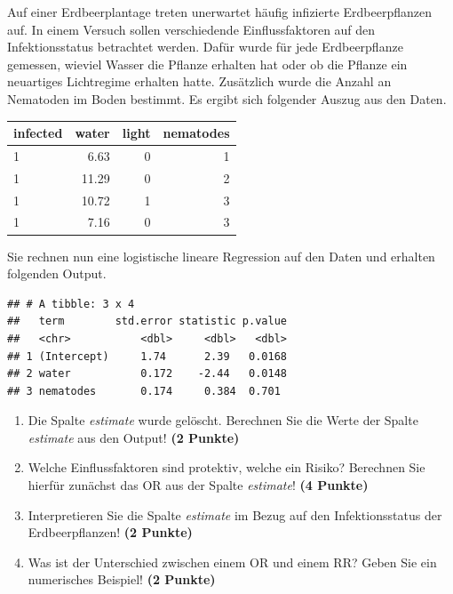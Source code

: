 \documentclass[a4paper, 10pt]{scrartcl}\usepackage[]{graphicx}\usepackage[]{xcolor}
\makeatletter
\newenvironment{kframe}{%
 \def\at@end@of@kframe{}%
 \ifinner\ifhmode%
  \def\at@end@of@kframe{\end{minipage}}%
  \begin{minipage}{\columnwidth}%
 \fi\fi%
 \def\FrameCommand##1{\hskip\@totalleftmargin \hskip-\fboxsep
 \colorbox{shadecolor}{##1}\hskip-\fboxsep
     \hskip-\linewidth \hskip-\@totalleftmargin \hskip\columnwidth}%
 \MakeFramed {\advance\hsize-\width
   \@totalleftmargin\z@ \linewidth\hsize
   \@setminipage}}%
 {\par\unskip\endMakeFramed%
 \at@end@of@kframe}
\newenvironment{knitrout}{}{} %
\makeatother
\begin{document}
Auf einer Erdbeerplantage treten unerwartet h{\"a}ufig infizierte
Erdbeerpflanzen auf. In einem Versuch sollen verschiedende Einflussfaktoren
auf den Infektionsstatus betrachtet werden. Daf{\"u}r wurde f{\"u}r jede
Erdbeerpflanze gemessen, wieviel Wasser die Pflanze erhalten hat oder ob
die Pflanze ein neuartiges Lichtregime erhalten hatte. Zus{\"a}tzlich wurde die
Anzahl an Nematoden im Boden bestimmt. Es ergibt sich folgender Auszug aus
den Daten.

\begin{knitrout}
\color{fgcolor}\begin{table}[!h]
\centering
\begin{tabular}{lrrr}
\toprule
infected & water & light & nematodes\\
\midrule
1 & 6.63 & 0 & 1\\
1 & 11.29 & 0 & 2\\
1 & 10.72 & 1 & 3\\
1 & 7.16 & 0 & 3\\
\bottomrule
\end{tabular}
\end{table}

\end{knitrout}

Sie rechnen nun eine logistische lineare Regression auf den Daten und erhalten
folgenden \Rlogo Output.

\begin{knitrout}
\color{fgcolor}\begin{kframe}
\begin{verbatim}
## # A tibble: 3 x 4
##   term        std.error statistic p.value
##   <chr>           <dbl>     <dbl>   <dbl>
## 1 (Intercept)     1.74      2.39   0.0168
## 2 water           0.172    -2.44   0.0148
## 3 nematodes       0.174     0.384  0.701
\end{verbatim}
\end{kframe}
\end{knitrout}


\begin{enumerate}
\item Die Spalte \textit{estimate} wurde gel{\"o}scht. Berechnen Sie die Werte
  der Spalte \textit{estimate} aus den \Rlogo Output! \textbf{(2 Punkte)}
\item Welche Einflussfaktoren sind protektiv, welche ein Risiko? Berechnen
  Sie hierf{\"u}r zun{\"a}chst das OR aus der Spalte \textit{estimate}! \textbf{(4 Punkte)}
\item Interpretieren Sie die Spalte \textit{estimate} im Bezug auf den
  Infektionsstatus der Erdbeerpflanzen! \textbf{(2 Punkte)}
\item Was ist der Unterschied zwischen einem OR und einem RR? Geben Sie ein
  numerisches Beispiel! \textbf{(2 Punkte)}
\end{enumerate}
 
\end{document}

